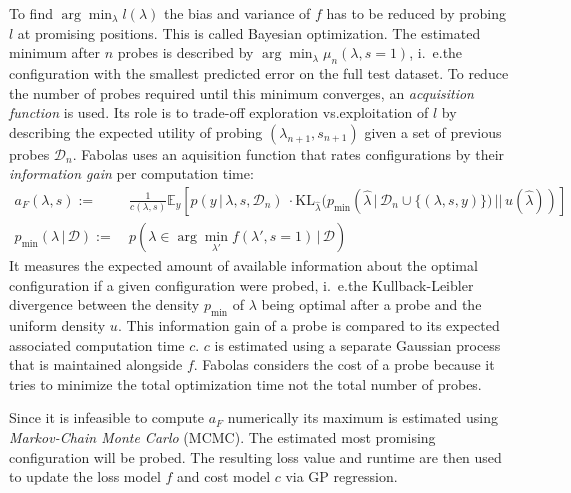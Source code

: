 To find \(\arg\min_\lambda l(\lambda)\) the bias and variance of \(f\) has to be reduced by probing \(l\) at promising positions.
This is called Bayesian optimization.
The estimated minimum after \(n\) probes is described by \(\arg\min_\lambda \mu_n(\lambda, s = 1)\), i.~e.\@ the configuration with the smallest predicted error on the full test dataset.
To reduce the number of probes required until this minimum converges, an \textit{acquisition function} is used.
Its role is to trade-off exploration vs.\@ exploitation of \(l\) by describing the expected utility of probing \((\lambda_{n+1}, s_{n+1})\) given a set of previous probes \(\mathcal{D}_n\).
Fabolas uses an aquisition function that rates configurations by their \textit{information gain} per computation time:
\begin{align}
	a_F(\lambda, s) :=&\ \frac{1}{c(\lambda, s)} \mathbb{E}_y\left[ p(y\, |\, \lambda, s, \mathcal{D}_n)\ \cdot \mathrm{KL}_{\hat{\lambda}}(p_{\min}(\hat{\lambda}\, |\, \mathcal{D}_n \cup \{(\lambda, s, y)\})\, ||\, u(\hat{\lambda}))\right] \\
	p_{\min}(\lambda\, |\, \mathcal{D}) :=&\ p(\lambda \in \arg\min_{\lambda'}{f(\lambda', s = 1)}\, |\, \mathcal{D}) \nonumber
\end{align}
It measures the expected amount of available information about the optimal configuration if a given configuration were probed, i.~e.\@ the Kullback-Leibler divergence between the density \(p_\min\) of \(\lambda\) being optimal after a probe and the uniform density \(u\).
This information gain of a probe is compared to its expected associated computation time \(c\).
\(c\) is estimated using a separate Gaussian process that is maintained alongside \(f\).
Fabolas considers the cost of a probe because it tries to minimize the total optimization time not the total number of probes.

Since it is infeasible to compute \(a_F\) numerically its maximum is estimated using \textit{Markov-Chain Monte Carlo} (MCMC).
The estimated most promising configuration will be probed.
The resulting loss value and runtime are then used to update the loss model \(f\) and cost model \(c\) via GP regression.

